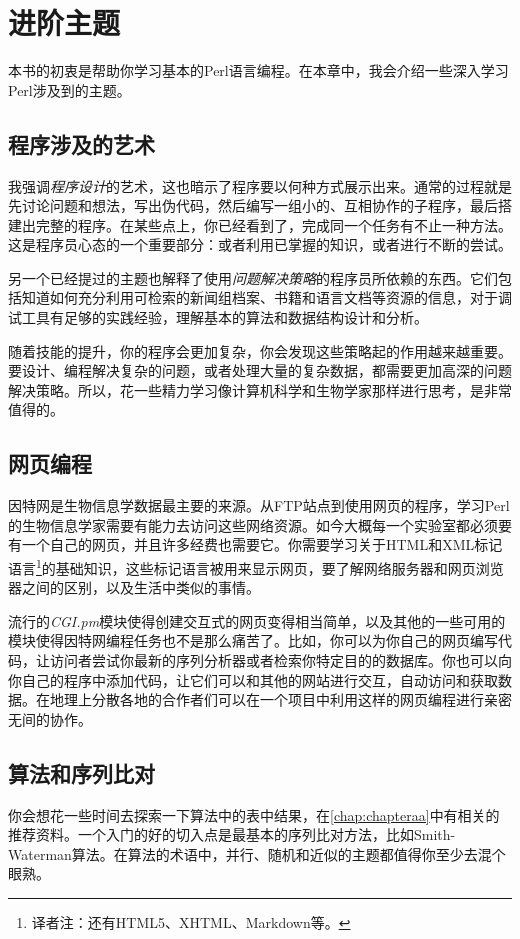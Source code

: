 \chapter{进阶主题}
\label{chap:chapter13}
\minitoc

本书的初衷是帮助你学习基本的Perl语言编程。在本章中，我会介绍一些深入学习Perl涉及到的主题。

\section{程序涉及的艺术}
我强调\textit{程序设计}的艺术，这也暗示了程序要以何种方式展示出来。通常的过程就是先讨论问题和想法，写出伪代码，然后编写一组小的、互相协作的子程序，最后搭建出完整的程序。在某些点上，你已经看到了，完成同一个任务有不止一种方法。这是程序员心态的一个重要部分：或者利用已掌握的知识，或者进行不断的尝试。

另一个已经提过的主题也解释了使用\textit{问题解决策略}的程序员所依赖的东西。它们包括知道如何充分利用可检索的新闻组档案、书籍和语言文档等资源的信息，对于调试工具有足够的实践经验，理解基本的算法和数据结构设计和分析。

随着技能的提升，你的程序会更加复杂，你会发现这些策略起的作用越来越重要。要设计、编程解决复杂的问题，或者处理大量的复杂数据，都需要更加高深的问题解决策略。所以，花一些精力学习像计算机科学和生物学家那样进行思考，是非常值得的。

\section{网页编程}
  因特网是生物信息学数据最主要的来源。从FTP站点到使用网页的程序，学习Perl的生物信息学家需要有能力去访问这些网络资源。如今大概每一个实验室都必须要有一个自己的网页，并且许多经费也需要它。你需要学习关于HTML和XML标记语言\footnote{译者注：还有HTML5、XHTML、Markdown等。}的基础知识，这些标记语言被用来显示网页，要了解网络服务器和网页浏览器之间的区别，以及生活中类似的事情。

流行的\textit{CGI.pm}模块使得创建交互式的网页变得相当简单，以及其他的一些可用的模块使得因特网编程任务也不是那么痛苦了。比如，你可以为你自己的网页编写代码，让访问者尝试你最新的序列分析器或者检索你特定目的的数据库。你也可以向你自己的程序中添加代码，让它们可以和其他的网站进行交互，自动访问和获取数据。在地理上分散各地的合作者们可以在一个项目中利用这样的网页编程进行亲密无间的协作。

\section{算法和序列比对}
你会想花一些时间去探索一下算法中的表中结果，在\autoref{chap:chapteraa}中有相关的推荐资料。一个入门的好的切入点是最基本的序列比对方法，比如Smith-Waterman算法。在算法的术语中，并行、随机和近似的主题都值得你至少去混个眼熟。

